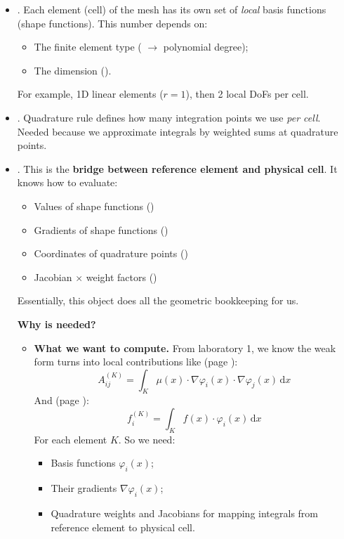 \begin{itemize}
    \item {}. Each element (cell) of the mesh has its own set of \emph{local} basis functions (shape functions). This number depends on:
    \begin{itemize}
        \item The finite element type ( $\rightarrow$ polynomial degree);
        \item The dimension ().
    \end{itemize}
    For example, 1D linear elements ($r=1$), then 2 local DoFs per cell.


    \item {}. Quadrature rule defines how many integration points we use \emph{per cell}. Needed because we approximate integrals by weighted sums at quadrature points.


    \item {}. This is the \textbf{bridge between reference element and physical cell}. It knows how to evaluate:
    \begin{itemize}
        \item Values of shape functions ()
        \item Gradients of shape functions ()
        \item Coordinates of quadrature points ()
        \item Jacobian $\times$ weight factors ()
    \end{itemize}
    Essentially, this object does all the geometric bookkeeping for us.

    \textcolor{Green3}{ \textbf{Why is  needed?}}
    \begin{itemize}
        \item[\textcolor{Green3}{\faIcon{question-circle}}] \textcolor{Green3}{\textbf{What we want to compute.}} From laboratory 1, we know the weak form turns into local contributions like (page \pageref{eq: stiffness matrix}):
        \begin{equation*}
            A^{(K)}_{ij} = \int_{K} \mu(x) \cdot \nabla \varphi_i(x) \cdot \nabla \varphi_j(x) \, \mathrm{d}x
        \end{equation*}
        And (page \pageref{eq: nodal forces}):
        \begin{equation*}
            f^{(K)}_{i} = \int_{K} f(x) \cdot \varphi_i(x)\, \mathrm{d}x
        \end{equation*}
        For each element $K$. So we need:
        \begin{itemize}
            \item Basis functions $\varphi_i(x)$;
            \item Their gradients $\nabla \varphi_i(x)$;
            \item Quadrature weights and Jacobians for mapping integrals from reference element to physical cell.
        \end{itemize}


\end{itemize}
\end{itemize}
